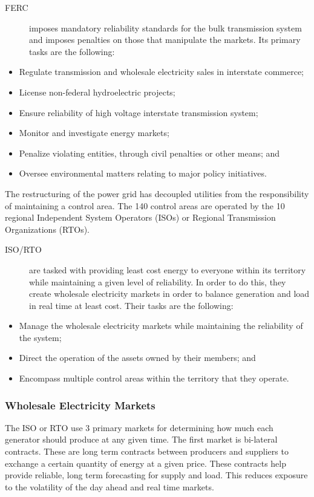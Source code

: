 \begin{description}
\item[FERC] imposes mandatory reliability standards for the bulk transmission system and imposes penalties on those that manipulate the markets.  Its primary tasks are the following:
\end{description}
\begin{itemize}
\item Regulate transmission and wholesale electricity sales in interstate commerce;
\item License non-federal hydroelectric projects;
\item Ensure reliability of high voltage interstate transmission system;
\item Monitor and investigate energy markets;
\item Penalize violating entities, through civil penalties or other means; and
\item Oversee environmental matters relating to major policy initiatives.
\end{itemize}

The restructuring of the power grid has decoupled utilities from the responsibility of maintaining a control area.  The 140 control areas are operated by the 10 regional Independent System Operators (ISOs) or Regional Transmission Organizations (RTOs).  
\begin{description}
\item[ISO/RTO] are tasked with providing least cost energy to everyone within its territory while maintaining a given level of reliability.  In order to do this, they create wholesale electricity markets in order to balance generation and load in real time at least cost.  Their tasks are the following:
\end{description}
\begin{itemize}
\item Manage the wholesale electricity markets while maintaining the reliability of the system; 
\item Direct the operation of the assets owned by their members; and
\item Encompass multiple control areas within the territory that they operate.
\end{itemize}

\subsubsection{Wholesale Electricity Markets}
The ISO or RTO use 3 primary markets for determining how much each generator should produce at any given time.  The first market is bi-lateral contracts.  These are long term contracts between producers and suppliers to exchange a certain quantity of energy at a given price.  These contracts help provide reliable, long term forecasting for supply and load. This reduces exposure to the volatility of the day ahead and real time markets.  

